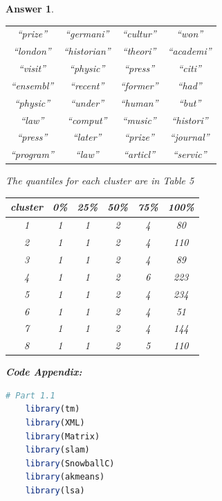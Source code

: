 \documentclass[12pt]{article}
\theoremstyle{colon}
\newtheorem*{answer}{Answer}
\begin{document}
\begin{answer}
\begin{enumerate}[label=\arabic*)]
\begin{center}
\begin{tabular}{ c | c | c | c }
          ``prize''     & ``germani''   & ``cultur''    & ``won''        \\
          ``london''    & ``historian'' & ``theori''    & ``academi''    \\
          ``visit''     & ``physic''    & ``press''     & ``citi''       \\
          ``ensembl''   & ``recent''    & ``former''    & ``had''        \\
          ``physic''    & ``under''     & ``human''     & ``but''        \\
          ``law''       & ``comput''    & ``music''     & ``histori''    \\
          ``press''     & ``later''     & ``prize''     & ``journal''    \\
          ``program''   & ``law''       & ``articl''    & ``servic''
        \end{tabular}
      \end{center}

      \clearpage

      The quantiles for each cluster are in Table 5
      \begin{center}
        \begin{tabular}{ c | c | c | c | c | c }
          cluster & 0\% & 25\% & 50\% & 75\% & 100\% \\
          \hline
          1 & 1 & 1 & 2 & 4 & 80 \\
          2 & 1 & 1 & 2 & 4 & 110 \\
          3 & 1 & 1 & 2 & 4 & 89 \\
          4 & 1 & 1 & 2 & 6 & 223 \\
          5 & 1 & 1 & 2 & 4 & 234 \\
          6 & 1 & 1 & 2 & 4 & 51 \\
          7 & 1 & 1 & 2 & 4 & 144 \\
          8 & 1 & 1 & 2 & 5 & 110
        \end{tabular}
      \end{center}
  \end{enumerate}

  \textbf{Code Appendix:}

  \begin{lstlisting}[language=R, basicstyle=\scriptsize, breaklines=true]
    # Part 1.1
    library(tm)
    library(XML)
    library(Matrix)
    library(slam)
    library(SnowballC)
    library(akmeans)
    library(lsa)


\end{lstlisting}
\end{answer}
\end{document}
